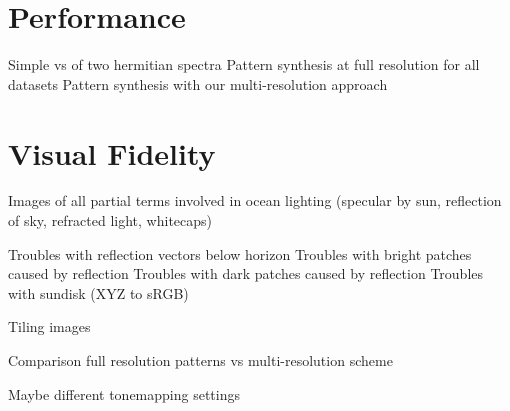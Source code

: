 \begin{figure}
{	%
 }
 \hfill
\caption{
}
\label{fig:results}
\end{figure}

\section{Performance}

Simple \InvFourierTransform vs \InvFourierTransform of two hermitian spectra
Pattern synthesis at full resolution for all datasets
Pattern synthesis with our multi-resolution approach

\section{Visual Fidelity}

Images of all partial terms involved in ocean lighting (specular by sun,
reflection of sky, refracted light, whitecaps)

Troubles with reflection vectors below horizon
Troubles with bright patches caused by reflection
Troubles with dark patches caused by reflection
Troubles with sundisk (XYZ to sRGB)

Tiling images

Comparison full resolution patterns vs multi-resolution scheme

Maybe different tonemapping settings